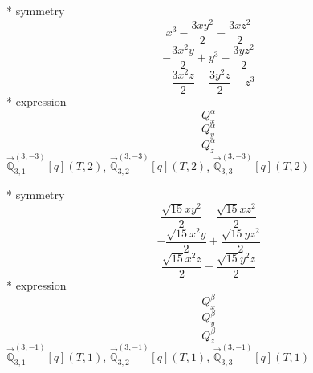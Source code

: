 \documentclass[fleqn,8pt]{jsarticle}
\begin{document}
\noindent\quad ** symmetry
\begin{dmath*}
x^{3} - \frac{3 x y^{2}}{2} - \frac{3 x z^{2}}{2}
\end{dmath*}
\begin{dmath*}
- \frac{3 x^{2} y}{2} + y^{3} - \frac{3 y z^{2}}{2}
\end{dmath*}
\begin{dmath*}
- \frac{3 x^{2} z}{2} - \frac{3 y^{2} z}{2} + z^{3}
\end{dmath*}
\noindent\quad ** expression
\begin{dmath*}
Q_{x}^{\alpha}
\end{dmath*}
\begin{dmath*}
Q_{y}^{\alpha}
\end{dmath*}
\begin{dmath*}
Q_{z}^{\alpha}
\end{dmath*}
\noindent\quad $\vec{\mathbb{Q}}_{3,1}^{(3,-3)}[q](T,2)$, $\vec{\mathbb{Q}}_{3,2}^{(3,-3)}[q](T,2)$, $\vec{\mathbb{Q}}_{3,3}^{(3,-3)}[q](T,2)$

\noindent\quad ** symmetry
\begin{dmath*}
\frac{\sqrt{15} x y^{2}}{2} - \frac{\sqrt{15} x z^{2}}{2}
\end{dmath*}
\begin{dmath*}
- \frac{\sqrt{15} x^{2} y}{2} + \frac{\sqrt{15} y z^{2}}{2}
\end{dmath*}
\begin{dmath*}
\frac{\sqrt{15} x^{2} z}{2} - \frac{\sqrt{15} y^{2} z}{2}
\end{dmath*}
\noindent\quad ** expression
\begin{dmath*}
Q_{x}^{\beta}
\end{dmath*}
\begin{dmath*}
Q_{y}^{\beta}
\end{dmath*}
\begin{dmath*}
Q_{z}^{\beta}
\end{dmath*}
\noindent\quad $\vec{\mathbb{Q}}_{3,1}^{(3,-1)}[q](T,1)$, $\vec{\mathbb{Q}}_{3,2}^{(3,-1)}[q](T,1)$, $\vec{\mathbb{Q}}_{3,3}^{(3,-1)}[q](T,1)$
\end{document}
